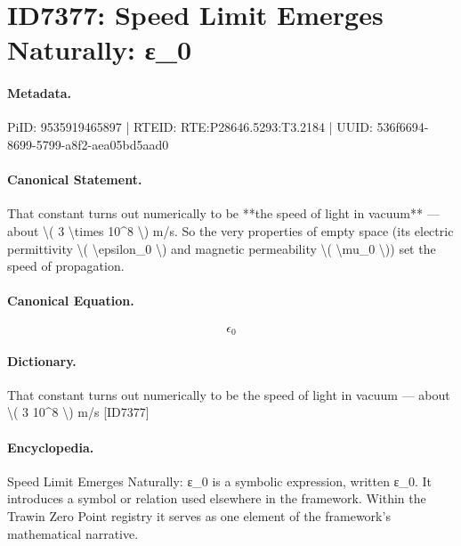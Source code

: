 \section*{ID7377: Speed Limit Emerges Naturally: ε\_0}
\paragraph{Metadata.}
PiID: 9535919465897 | RTEID: RTE:P28646.5293:T3.2184 | UUID: 536f6694-8699-5799-a8f2-aea05bd5aad0

\paragraph{Canonical Statement.}
That constant turns out numerically to be **the speed of light in vacuum** — about \textbackslash{}( 3 \textbackslash{}times 10\textasciicircum{}8 \textbackslash{}) m/s. So the very properties of empty space (its electric permittivity \textbackslash{}( \textbackslash{}epsilon\_0 \textbackslash{}) and magnetic permeability \textbackslash{}( \textbackslash{}mu\_0 \textbackslash{})) set the speed of propagation.

\paragraph{Canonical Equation.}
\[
\epsilon_0
\]

\paragraph{Dictionary.}
That constant turns out numerically to be the speed of light in vacuum — about \textbackslash{}( 3 10\textasciicircum{}8 \textbackslash{}) m/s [ID7377]

\paragraph{Encyclopedia.}
Speed Limit Emerges Naturally: ε\_0 is a symbolic expression, written ε\_0. It introduces a symbol or relation used elsewhere in the framework. Within the Trawin Zero Point registry it serves as one element of the framework's mathematical narrative.
